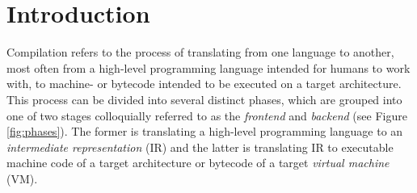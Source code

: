 \documentclass{article}
\begin{document}
\tableofcontents
\newpage




    
\setcounter{page}{1}

\section{Introduction}

Compilation refers to the process of translating from one language to another, most often from a high-level programming language intended for humans to work with, to machine- or bytecode intended to be executed on a target architecture. This process can be divided into several distinct phases, which are grouped into one of two stages colloquially referred to as the \textit{frontend} and \textit{backend} (see Figure \ref{fig:phases}). The former is translating a high-level programming language to an \textit{intermediate representation} (IR) and the latter is translating IR to executable machine code of a target architecture or bytecode of a target \textit{virtual machine} (VM).
\end{document}
